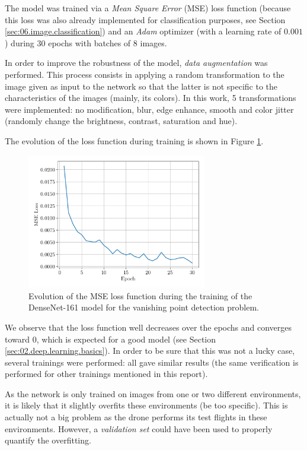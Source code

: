 The model was trained via a \emph{Mean Square Error} (MSE) loss function (because this loss was also already implemented for classification purposes, see Section \ref{sec:06.image.classification}) and an \emph{Adam} \cite{kingma2014adam} optimizer (with a learning rate of $\num{0.001}$) during $\num{30}$ epochs with batches of $\num{8}$ images.

In order to improve the robustness of the model, \emph{data augmentation} was performed. This process consists in applying a random transformation to the image given as input to the network so that the latter is not specific to the characteristics of the images (mainly, its colors). In this work, 5 transformations were implemented: no modification, blur, edge enhance, smooth and color jitter (randomly change the brightness, contrast, saturation and hue).

The evolution of the loss function during training is shown in Figure \ref{fig:06.vpdeeplearning.mse.loss}.

\begin{figure}[H]
    \centering
    \includegraphics[width=0.7\textwidth]{resources/pdf/06/vanishing-point/vpdeeplearning/mse-loss.pdf}
    \caption{Evolution of the MSE loss function during the training of the DenseNet-161 model for the vanishing point detection problem.}
    \label{fig:06.vpdeeplearning.mse.loss}
\end{figure}

We observe that the loss function well decreases over the epochs and converges toward $\num{0}$, which is expected for a good model (see Section \ref{sec:02.deep.learning.basics}). In order to be sure that this was not a lucky case, several trainings were performed: all gave similar results (the same verification is performed for other trainings mentioned in this report).

\begin{note}
    As the network is only trained on images from one or two different environments, it is likely that it slightly overfits these environments (be too specific). This is actually not a big problem as the drone performs its test flights in these environments. However, a \emph{validation set} could have been used to properly quantify the overfitting.
\end{note}


